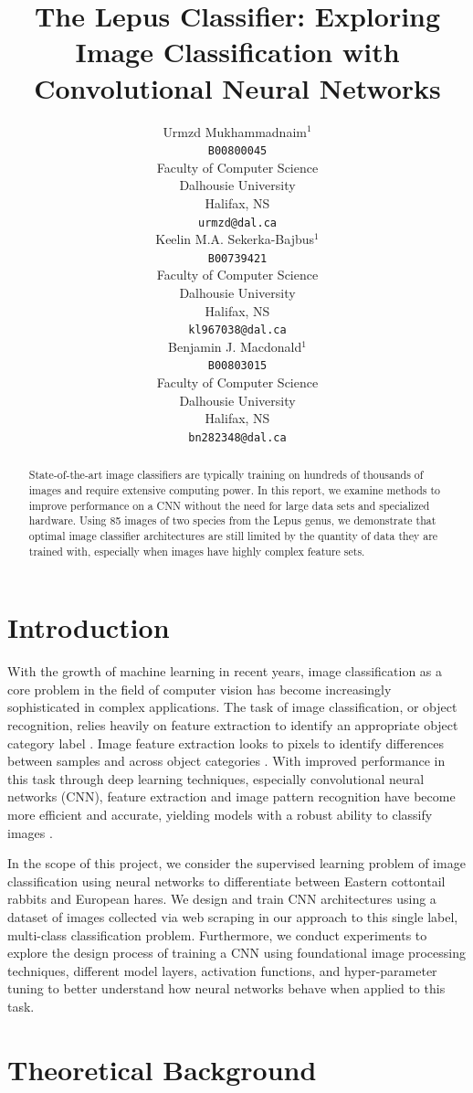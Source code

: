 \documentclass{article}
\title{The Lepus Classifier: Exploring Image Classification with Convolutional Neural Networks}
\author{%
  Urmzd
  Mukhammadnaim$^1$\\
  \texttt{B00800045}\\
  Faculty of Computer Science\\
  Dalhousie University\\
  Halifax, NS  \\
  \texttt{urmzd@dal.ca} \\
  \And
  Keelin M.A.
  Sekerka-Bajbus$^1$\\
  \texttt{B00739421}\\
  Faculty of Computer Science\\
  Dalhousie University\\
  Halifax, NS  \\
  \texttt{kl967038@dal.ca} \\
  \AND
  Benjamin J. Macdonald$^1$ \\
  \texttt{B00803015}\\
  Faculty of Computer Science\\
  Dalhousie University\\
  Halifax, NS  \\
  \texttt{bn282348@dal.ca} \\
}
\begin{document}
\maketitle
\begin{abstract}
  State-of-the-art image classifiers are typically training on hundreds of thousands of images and require extensive computing power. In this report, we examine methods to improve performance on a CNN without the need for large data sets and specialized hardware. Using 85 images of two species from the Lepus genus, we demonstrate that optimal image classifier architectures are still limited by the quantity of data they are trained with, especially when images have highly complex feature sets.

\end{abstract}

\section{Introduction}

With the growth of machine learning in recent years, image classification as a core problem in the field of computer vision has become increasingly sophisticated in complex applications. The task of image classification, or object recognition, relies heavily on feature extraction to identify an appropriate object category label \cite{SHARMA2018377,8078730}. Image feature extraction looks to pixels to identify differences between samples and across object categories \cite{SHARMA2018377}. With improved performance in this task through deep learning techniques, especially convolutional neural networks (CNN), feature extraction and image pattern recognition have become more efficient and accurate, yielding models with a robust ability to classify images \cite{SHARMA2018377,8078730}.

In the scope of this project, we consider the supervised learning problem of image classification using neural networks to differentiate between Eastern cottontail rabbits and European hares. We design and train CNN architectures using a dataset of images collected via web scraping in our approach to this single label, multi-class classification problem. Furthermore, we conduct experiments to explore the design process of training a CNN using foundational image processing techniques, different model layers, activation functions, and hyper-parameter tuning to better understand how neural networks behave when applied to this task.

\section{Theoretical Background}
\end{document}
